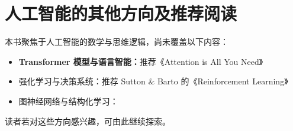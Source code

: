 \chapter*{人工智能的其他方向及推荐阅读}

本书聚焦于人工智能的数学与思维逻辑，尚未覆盖以下内容：
\begin{itemize}
\item {\bf  Transformer 模型与语言智能：}推荐《Attention is All You Need》

\item{强化学习与决策系统：}推荐 Sutton $\&$ Barto 的《Reinforcement Learning》

\item{图神经网络与结构化学习：}
\end{itemize}


读者若对这些方向感兴趣，可由此继续探索。